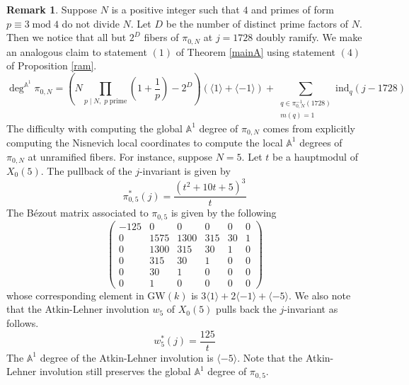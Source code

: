 \documentclass[12pt, reqno]{amsart}
\theoremstyle{definition}
\newtheorem{remark}[theorem]{Remark}
\newcommand{\A}{\mathbb{A}} %
\newcommand{\GW}{\mathrm{GW}} %
\newcommand{\Adeg}{\deg^{\mathbb{A}^1}} %
\newcommand{\ind}{\mathrm{ind}} %
\begin{document}
\begin{remark}\label{nonex2}
Suppose $N$ is a positive integer such that $4$ and primes of form $p \equiv 3 \; \text{mod} \; 4$ do not divide $N$. Let $D$ be the number of distinct prime factors of $N$. Then we notice that all but $2^D$ fibers of $\pi_{0,N}$ at $j = 1728$ doubly ramify. We make an analogous claim to statement $(1)$ of Theorem \ref{mainA} using statement $(4)$ of Proposition \ref{ram}.
\begin{equation*}
    \Adeg \pi_{0,N} = \left(N \prod_{p \mid N, \; p \; \text{prime}} \left( 1 + \frac{1}{p} \right) - 2^D \right) \left( \langle 1 \rangle + \langle -1 \rangle \right) + \sum_{\substack{q \in \pi_{0,N}^{-1}(1728) \\ m(q) = 1}} \ind_q (j-1728)
\end{equation*}
The difficulty with computing the global $\A^1$ degree of $\pi_{0,N}$ comes from explicitly computing the Nisnevich local coordinates to compute the local $\A^1$ degrees of $\pi_{0,N}$ at unramified fibers. For instance, suppose $N = 5$. Let $t$ be a hauptmodul of $X_0(5)$. The pullback of the $j$-invariant is given by
\begin{equation*}
    \pi_{0,5}^*(j) = \frac{(t^2+10t+5)^3}{t}
\end{equation*}
The B\'ezout matrix associated to $\pi_{0,5}$ is given by the following
\begin{equation*}
    \begin{pmatrix} -125 & 0 & 0 & 0 & 0 & 0 \\ 0 & 1575 & 1300 & 315 & 30 & 1 \\ 0 & 1300 & 315 & 30 & 1 & 0 \\ 0 & 315 & 30 & 1 & 0 & 0 \\ 0 & 30 & 1 & 0 & 0 & 0 \\ 0 & 1 & 0 & 0 & 0 & 0 \end{pmatrix}
\end{equation*}
whose corresponding element in $\GW(k)$ is $3\langle 1 \rangle + 2\langle -1 \rangle + \langle -5 \rangle$. We also note that the Atkin-Lehner involution $w_5$ of $X_0(5)$ pulls back the $j$-invariant as follows.
\begin{equation*}
    w_5^*(j) = \frac{125}{t}
\end{equation*}
The $\A^1$ degree of the Atkin-Lehner involution is $\langle -5 \rangle$. Note that the Atkin-Lehner involution still preserves the global $\A^1$ degree of $\pi_{0,5}$.
\end{remark}
\end{document}
